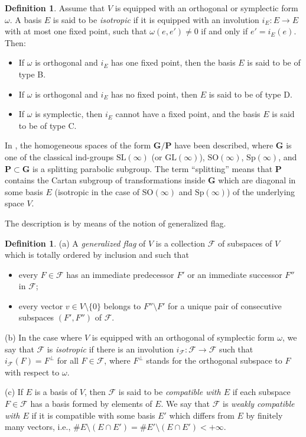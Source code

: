 \documentclass[12pt]{amsart}
\theoremstyle{definition}
\newtheorem{definition}[theorem]{Definition}
\newcommand{\GL}{\mathrm{GL}}
\begin{document}
\begin{definition}
\label{D2.1}
Assume that $V$ is equipped with an orthogonal or symplectic form $\omega$.
A basis $E$ is said to be {\em isotropic} if it is equipped with an involution
$i_E:E\to E$ with at most one fixed point, such that $\omega(e,e')\not=0$ if and only if $e'=i_E(e)$.
Then:
\begin{itemize}
\item If $\omega$ is orthogonal and $i_E$ has one fixed point, then the basis $E$ is said to be of type B.
\item If $\omega$ is orthogonal and $i_E$ has no fixed point, then $E$ is said to be of type D.
\item If $\omega$ is symplectic, then $i_E$ cannot have a fixed point, and the basis $E$ is said to be of type C.
\end{itemize}
\end{definition}

In \cite{Dimitrov-Penkov}, the homogeneous spaces of the form $\mathbf{G}/\mathbf{P}$ have been described, where $\mathbf{G}$ is one of the classical ind-groups $\mathrm{SL}(\infty)$ (or $\GL(\infty)$), $\mathrm{SO}(\infty)$, $\mathrm{Sp}(\infty)$,
and $\mathbf{P}\subset \mathbf{G}$ is a splitting parabolic subgroup.
The term ``splitting'' means that $\mathbf{P}$ contains the Cartan subgroup of transformations inside $\mathbf{G}$ which are diagonal in some basis $E$ (isotropic in the case of $\mathrm{SO}(\infty)$ and $\mathrm{Sp}(\infty)$) of the underlying space $V$.


The description is by means of the notion of generalized flag.

\begin{definition}
(a) A {\em generalized flag} of $V$ is a collection $\mathcal{F}$ of subspaces of $V$ which is totally ordered by inclusion and such that
\begin{itemize}
    \item every $F\in\mathcal{F}$ has an immediate predecessor $F'$ or an immediate successor $F''$ in $\mathcal{F}$;
    \item every vector $v\in V\setminus\{0\}$ belongs to $F''\setminus F'$ for a unique pair of consecutive subspaces $(F',F'')$ of $\mathcal{F}$.
\end{itemize}

(b) In the case where $V$ is equipped with an orthogonal of symplectic form $\omega$,
we say that $\mathcal{F}$ is {\it isotropic} if there is an involution $i_\mathcal{F}:\mathcal{F}\to\mathcal{F}$ such that $i_\mathcal{F}(F)=F^\perp$ for all $F\in\mathcal{F}$, where $F^\perp$ stands for the orthogonal subspace to $F$ with respect to $\omega$.

(c) If $E$ is a basis of $V$, then $\mathcal{F}$ is said to be {\em compatible with $E$} if 
each subspace $F\in\mathcal{F}$ has a basis formed by elements of $E$.
We say that $\mathcal{F}$ is {\em weakly compatible with $E$} if it is compatible with some basis $E'$ which differs from $E$ by finitely many vectors, i.e.,
$\# E\setminus(E\cap E')=\# E'\setminus(E\cap E')<+\infty$.
\end{definition}
\end{document}
